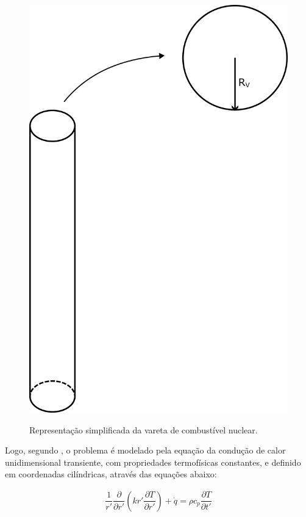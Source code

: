 \begin{figure}[H]
    \centering
    \caption{Representação simplificada da vareta de combustível nuclear.}
    \includegraphics[scale=0.75]{figures/others/cilinder.png}
    \label{fig:cilinder}
\end{figure}

Logo, segundo \citet{soares2017}, o problema é modelado pela equação da condução de calor unidimensional transiente, com propriedades termofísicas constantes, e definido em coordenadas cilíndricas, através das equações abaixo:

\begin{gather}
    \dfrac{1}{r '} \dfrac{\partial}{\partial r '} \left( k r ' \dfrac{\partial T}{\partial r '} \right) + \dot{q} = \rho c_p \dfrac{\partial T}{\partial t '}
\end{gather}

